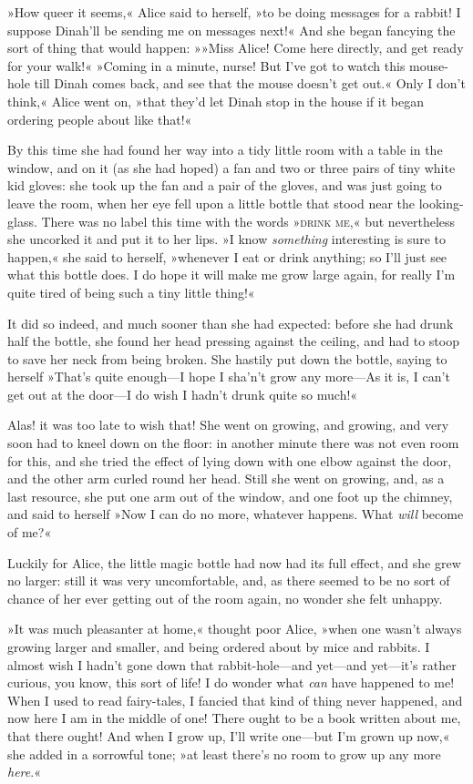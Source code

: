 »How queer it seems,« Alice said to herself, »to be doing messages for a rabbit! I suppose Dinah'll be sending me on messages next!« And she began fancying the sort of thing that would happen: »»Miss Alice! Come here directly, and get ready for your walk!« »Coming in a minute, nurse! But I've got to watch this mouse-hole till Dinah comes back, and see that the mouse doesn't get out.« Only I don't think,« Alice went on, »that they'd let Dinah stop in the house if it began ordering people about like that!«

By this time she had found her way into a tidy little room with a table in the window, and on it (as she had hoped) a fan and two or three pairs of tiny white kid gloves: she took up the fan and a pair of the gloves, and was just going to leave the room, when her eye fell upon a little bottle that stood near the looking-glass. There was no label this time with the words »\textsc{drink me},« but nevertheless she uncorked it and put it to her lips. »I know \textit{something} interesting is sure to happen,« she said to herself, »whenever I eat or drink anything; so I'll just see what this bottle does. I do hope it will make me grow large again, for really I'm quite tired of being such a tiny little thing!«

It did so indeed, and much sooner than she had expected: before she had drunk half the bottle, she found her head pressing against the ceiling, and had to stoop to save her neck from being broken. She hastily put down the bottle, saying to herself »That's quite enough—I hope I sha'n't grow any more—As it is, I can't get out at the door—I do wish I hadn't drunk quite so much!«

Alas! it was too late to wish that! She went on growing, and growing, and very soon had to kneel down on the floor: in another minute there was not even room for this, and she tried the effect of lying down with one elbow against the door, and the other arm curled round her head. Still she went on growing, and, as a last resource, she put one arm out of the window, and one foot up the chimney, and said to herself »Now I can do no more, whatever happens. What \textit{will} become of me?«

Luckily for Alice, the little magic bottle had now had its full effect, and she grew no larger: still it was very uncomfortable, and, as there seemed to be no sort of chance of her ever getting out of the room again, no wonder she felt unhappy.

»It was much pleasanter at home,« thought poor Alice, »when one wasn't always growing larger and smaller, and being ordered about by mice and rabbits. I almost wish I hadn't gone down that rabbit-hole—and yet—and yet—it's rather curious, you know, this sort of life! I do wonder what \textit{can} have happened to me! When I used to read fairy-tales, I fancied that kind of thing never happened, and now here I am in the middle of one! There ought to be a book written about me, that there ought! And when I grow up, I'll write one—but I'm grown up now,« she added in a sorrowful tone; »at least there's no room to grow up any more \textit{here}.«

